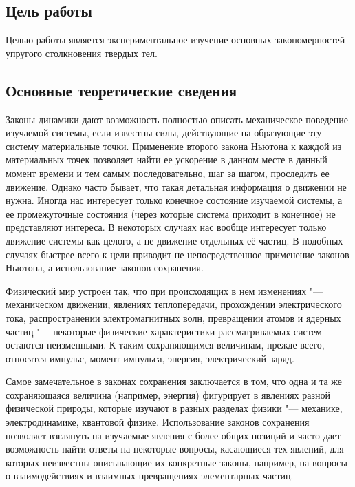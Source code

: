 \documentclass[a4paper, 12pt]{extarticle}
\begin{document}
\MTDTitlePage
\MTDInfoPage

\setcounter{section}{4}

\subsection{Цель работы}
Целью работы является экспериментальное изучение основных закономерностей упругого столкновения твердых тел.

\subsection{Основные теоретические сведения}

Законы динамики дают возможность полностью описать механическое поведение изучаемой системы, если известны силы, действующие на образующие эту систему материальные точки. Применение второго закона Ньютона к каждой из материальных точек позволяет найти ее ускорение в данном месте в данный момент времени и тем самым последовательно, шаг за шагом, проследить ее движение. Однако часто бывает, что такая детальная информация о движении не нужна.
Иногда нас интересует только конечное состояние изучаемой системы, а ее промежуточные состояния (через которые система приходит в конечное) %
не представляют интереса. В некоторых случаях нас вообще интересует только движение системы как целого, а не движение отдельных её частиц. %
В подобных случаях быстрее всего к цели приводит не непосредственное применение законов Ньютона, а использование законов сохранения.

Физический мир устроен так, что при происходящих в нем изменениях "--- механическом движении, явлениях теплопередачи, прохождении электрического тока, распространении электромагнитных волн, превращении атомов и ядерных частиц "--- некоторые физические характеристики рассматриваемых систем остаются неизменными. К таким сохраняющимся величинам, прежде всего, относятся импульс, момент импульса, энергия, электрический заряд.

 Самое замечательное в законах сохранения заключается в том, что одна и та же сохраняющаяся величина (например, энергия)  %
 фигурирует в явлениях разной физической природы, которые изучают в разных разделах физики "--- механике, электродинамике, квантовой физике. Использование законов сохранения позволяет взглянуть на изучаемые явления с более общих позиций и часто дает возможность найти ответы на некоторые вопросы, касающиеся тех явлений, для которых %
 неизвестны описывающие их конкретные законы, например, на вопросы о взаимодействиях и взаимных превращениях элементарных частиц. %
\end{document}
